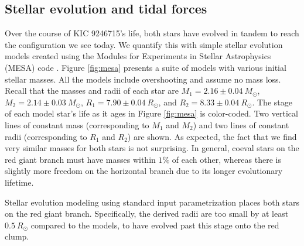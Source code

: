 \subsection{Stellar evolution and tidal forces}\label{tides}

Over the course of KIC 9246715's life, both stars have evolved in tandem to reach the configuration we see today. We quantify this with simple stellar evolution models created using the Modules for Experiments in Stellar Astrophysics (MESA) code \citep{pax11,pax13,pax15}. Figure \ref{fig:mesa} presents a suite of models with various initial stellar masses. All the models include overshooting and assume no mass loss. Recall that the masses and radii of each star are $M_1 = 2.16 \pm 0.04\ M_{\odot}$, $M_2 = 2.14 \pm 0.03\ M_{\odot}$, $R_1 = 7.90 \pm 0.04 \ R_{\odot}$, and $R_2 = 8.33 \pm 0.04 \ R_{\odot}$. The stage of each model star's life as it ages in Figure \ref{fig:mesa} is color-coded. Two vertical lines of constant mass (corresponding to $M_1$ and $M_2$) and two lines of constant radii (corresponding to $R_1$ and $R_2$) are shown. As expected, the fact that we find very similar masses for both stars is not surprising. In general, coeval stars on the red giant branch must have masses within $1\%$ of each other, whereas there is slightly more freedom on the horizontal branch due to its longer evolutionary lifetime.

Stellar evolution modeling using standard input parametrization places both stars on the red giant branch. Specifically, the derived radii are too small by at least $0.5 \ R_\odot$ compared to the models, to have evolved past this stage onto the red clump.

